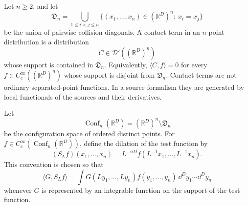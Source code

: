 \begin{definition}
\label{def:rg-contact-term}
Let \(n\geq2\), and let
\begin{equation}
  \mathfrak D_n
  =
  \bigcup_{1\leq i<j\leq n}
  \{(x_1,\ldots,x_n)\in(\mathbb R^D)^n:\ x_i=x_j\}
  \label{eq:collision-diagonal-union}
\end{equation}
be the union of pairwise collision diagonals.  A contact term in an
\(n\)-point distribution is a distribution
\[
  C\in\mathcal D'((\mathbb R^D)^n)
  \]
whose support is contained in \(\mathfrak D_n\).  Equivalently,
\(\langle C,f\rangle=0\) for every
\(f\in C_c^\infty((\mathbb R^D)^n)\) whose support is disjoint from
\(\mathfrak D_n\).  Contact terms are not ordinary separated-point
functions.  In a source formalism they are generated by local functionals of
the sources and their derivatives.
\end{definition}

Let
\begin{equation}
  \operatorname{Conf}_n(\mathbb R^D)
  =
  (\mathbb R^D)^n\setminus\mathfrak D_n
  \label{eq:configuration-space-distinct-points}
\end{equation}
be the configuration space of ordered distinct points.  For
\(f\in C_c^\infty(\operatorname{Conf}_n(\mathbb R^D))\), define the dilation
of the test function by
\begin{equation}
  (S_Lf)(x_1,\ldots,x_n)
  =
  L^{-nD}
  f(L^{-1}x_1,\ldots,L^{-1}x_n).
  \label{eq:test-function-dilation-for-correlators}
\end{equation}
This convention is chosen so that
\begin{equation}
  \langle G,S_Lf\rangle
  =
  \int G(Ly_1,\ldots,Ly_n)f(y_1,\ldots,y_n)\,
       \dd^Dy_1\cdots\dd^Dy_n
  \label{eq:test-dilation-change-of-variables}
\end{equation}
whenever \(G\) is represented by an integrable function on the support of
the test function.

